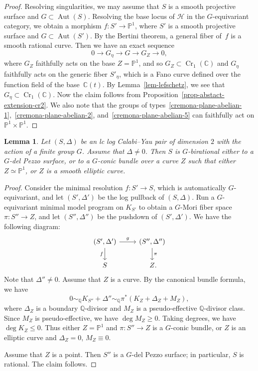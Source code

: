 \documentclass[11pt]{amsart}
\numberwithin{equation}{section}
\newtheorem{lem}[thm]{Lemma}
\theoremstyle{definition}
\theoremstyle{remark}
\newcommand{\lra}{\longrightarrow}
\DeclareMathOperator{\Cr}{Cr}
\DeclareMathOperator{\Aut}{Aut}
\begin{document}
\begin{proof}
Resolving singularities, we may assume that $S$ is a smooth projective surface and $G\subset \Aut(S)$. 
Resolving the base locus of $\mathcal{H}$ in the $G$-equivariant category, we obtain a morphism $f\colon S'\to \mathbb{P}^1$, where $S'$ is a smooth projective surface and $G\subset \Aut(S')$. By the Bertini theorem, a general fiber of~$f$ is a smooth rational curve.
Then we have an exact sequence
\[
0\lra G_\eta \lra G\lra G_Z\lra 0, 
\]
where $G_Z$ faithfully acts on the base $Z=\mathbb{P}^1$, and so $G_Z\subset \Cr_1(\mathbb{C})$ and $G_\eta$ faithfully acts on the generic fiber $S'_\eta$, which is a Fano curve defined over the function field of the base~$\mathbb{C}(t)$. By Lemma~\ref{lem-lefschetz}, we see that $G_\eta\subset \Cr_1(\mathbb{C})$.  
Now the claim follows from Proposition~\ref{prop-abstact-extension-cr2}. We also note that the groups of types~\eqref{cremona-plane-abelian-1},~\eqref{cremona-plane-abelian-2}, and~\eqref{cremona-plane-abelian-5} can faithfully act on $\mathbb{P}^1\times\mathbb{P}^1$. 
\end{proof}

\begin{lem}
\label{lem-2-dim-CY-pairs}
Let $(S, \Delta)$ be an lc log Calabi--Yau pair of dimension $2$ with
the action of a finite group $G$. 
Assume that $\Delta\neq 0$. 
Then $S$ is $G$-birational either to a
$G$-del Pezzo surface, or to a $G$-conic bundle over a curve $Z$ such
that either $Z\simeq \mathbb{P}^1$, or $Z$ is a smooth elliptic curve.
\end{lem}

\begin{proof}
  Consider the minimal resolution $f\colon S'\to S$, which is automatically $G$-equivariant, and let $(S', \Delta')$ be the log pullback of $(S, \Delta)$.
Run a $G$-equivariant minimal model program on $K_{S'}$ to obtain a $G$-Mori fiber space $\pi\colon S''\to Z$, and let $(S'', \Delta'')$ be the pushdown of $(S', \Delta')$. We have the following diagram:
\begin{equation}
\label{eq-diag-minimal-model-ruled-surface}
\begin{tikzcd}
(S', \Delta')  \arrow{r}{g} \arrow[swap]{d}{f} & (S'', \Delta'')  \arrow{d}{\pi} \\
S & Z\rlap{.}
\end{tikzcd}
\end{equation}
Note that $\Delta''\neq 0$.
Assume that $Z$ is a curve. 
By the canonical bundle formula, we have   
\[
0\sim_{\mathbb{Q}} K_{S''} + \Delta'' \sim_{\mathbb{Q}} \pi^*(K_Z + \Delta_Z + M_Z), 
\]
where $\Delta_Z$ is a boundary $\mathbb{Q}$-divisor and $M_Z$ is a pseudo-effective $\mathbb{Q}$-divisor class. Since $M_Z$ is pseudo-effective, we have $\deg M_Z\geq 0$. Taking degrees, we have $\deg K_Z\leq 0$. Thus either $Z=\mathbb{P}^1$ and $\pi\colon S''\to Z$ is a $G$-conic bundle, or $Z$ is an elliptic curve and $\Delta_Z=0$, $M_Z\equiv 0$. 

Assume that $Z$ is a point. Then $S''$ is a $G$-del Pezzo surface; in particular,  $S$ is rational. The claim follows.
\end{proof}
\end{document}
